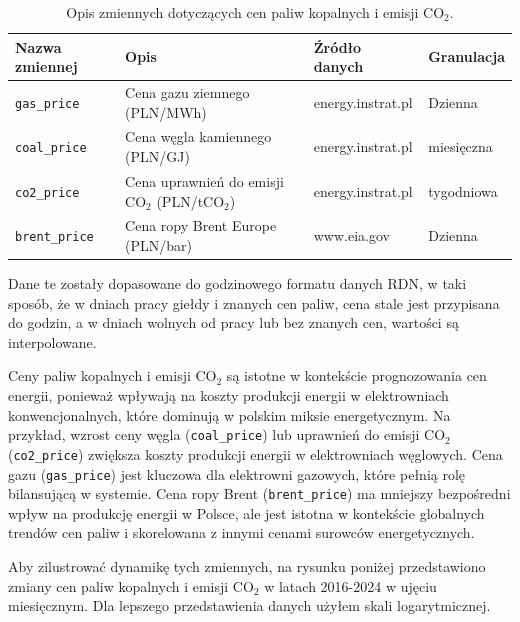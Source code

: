 \begin{table}[H]
    \centering
    \begin{tabular}{|l|l|l|l|}
    \hline
    \textbf{Nazwa zmiennej} & \textbf{Opis} & \textbf{Źródło danych} & \textbf{Granulacja} \\ \hline
    \texttt{gas\_price}     & Cena gazu ziemnego (PLN/MWh) & energy.instrat.pl & Dzienna \\ \hline
    \texttt{coal\_price}    & Cena węgla kamiennego (PLN/GJ) & energy.instrat.pl & miesięczna \\ \hline
    \texttt{co2\_price}     & Cena uprawnień do emisji CO$_2$ (PLN/tCO$_2$) & energy.instrat.pl & tygodniowa \\ \hline
    \texttt{brent\_price}   & Cena ropy Brent Europe (PLN/bar) & www.eia.gov & Dzienna \\ \hline
    \end{tabular}
    \caption{Opis zmiennych dotyczących cen paliw kopalnych i emisji CO$_2$.}
    \label{tab:fuel_variables}
\end{table}

Dane te zostały dopasowane do godzinowego formatu danych RDN, w taki sposób, że w dniach pracy giełdy i znanych cen paliw, cena stale jest przypisana do godzin, a w dniach wolnych od pracy lub bez znanych cen, wartości są interpolowane. 

Ceny paliw kopalnych i emisji CO$_2$ są istotne w kontekście prognozowania cen energii, ponieważ wpływają na koszty produkcji energii w elektrowniach konwencjonalnych, które dominują w polskim miksie energetycznym. Na przykład, wzrost ceny węgla (\texttt{coal\_price}) lub uprawnień do emisji CO$_2$ (\texttt{co2\_price}) zwiększa koszty produkcji energii w elektrowniach węglowych. Cena gazu (\texttt{gas\_price}) jest kluczowa dla elektrowni gazowych, które pełnią rolę bilansującą w systemie. Cena ropy Brent (\texttt{brent\_price}) ma mniejszy bezpośredni wpływ na produkcję energii w Polsce, ale jest istotna w kontekście globalnych trendów cen paliw i skorelowana z innymi cenami surowców energetycznych.

Aby zilustrować dynamikę tych zmiennych, na rysunku poniżej przedstawiono zmiany cen paliw kopalnych i emisji CO$_2$ w latach 2016-2024 w ujęciu miesięcznym. Dla lepszego przedstawienia danych użyłem skali logarytmicznej.

